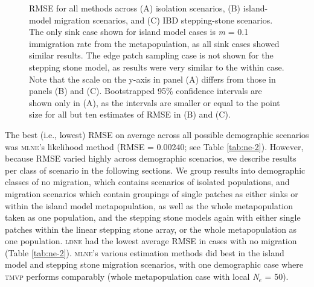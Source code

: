 \begin{figure}[]
\centering
{}
\caption[~- RMSE for all methods across (A) isolation scenarios, (B) island-model migration scenarios, and (C) 
IBD stepping-stone scenarios.]{RMSE for all methods across (A) isolation scenarios, (B) island-model migration scenarios, and (C) 
IBD stepping-stone scenarios. The only sink case shown for island model cases is \emph{m} = 0.1 immigration rate from 
the metapopulation, as all sink cases showed similar results. The edge patch sampling case is not shown for 
the stepping stone model, as results were very similar to the within case. Note that the scale on the y-axis 
in panel (A) differs from those in panels (B) and (C). Bootstrapped 95\% confidence intervals are shown only 
in (A), as the intervals are smaller or equal to the point size for all but ten estimates of RMSE in (B) and (C).}
\label{fig:ne-2}
\end{figure}

The best (i.e., lowest) RMSE on average across all possible demographic scenarios was \textsc{mlne}'s 
likelihood method (RMSE = 0.00240; see Table \ref{tab:ne-2}). However, because RMSE varied highly across demographic 
scenarios, we describe results per class of scenario in the following sections. We group results 
into demographic classes of no migration, which contains scenarios of isolated populations, and 
migration scenarios which contain groupings of single patches as either sinks or within the island 
model metapopulation, as well as the whole metapopulation taken as one population, and the stepping 
stone models again with either single patches within the linear stepping stone array, or the whole 
metapopulation as one population. \textsc{ldne} had the lowest average RMSE in cases with no migration 
(Table \ref{tab:ne-2}). \textsc{mlne}'s various estimation methods did best in the island model and stepping stone 
migration scenarios, with one demographic case where \textsc{tmvp} performs comparably 
(whole metapopulation case with local \emph{N}$_e$ = 50).

